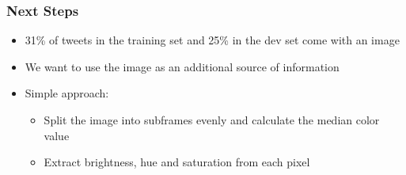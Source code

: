 \documentclass[10pt,aspectratio=169]{beamer}
\begin{document}
\begin{frame}
  \frametitle{Next Steps}
  \begin{itemize}
    \item 31\% of tweets in the training set and 25\% in the dev
      set come with an image
    \item We want to use the image as an additional source of information
    \item Simple approach:
    \begin{itemize}
      \item Split the image into subframes evenly and calculate the median color value
      \item Extract brightness, hue and saturation from each pixel
\end{itemize}
\end{itemize}
\end{frame}
\end{document}
